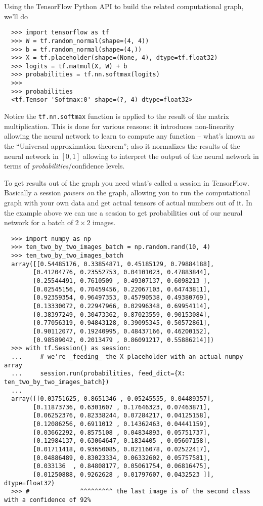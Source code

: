 Using the TensorFlow Python API to build the related computational
graph, we'll do

\begin{verbatim}
  >>> import tensorflow as tf
  >>> W = tf.random_normal(shape=(4, 4))
  >>> b = tf.random_normal(shape=(4,))
  >>> X = tf.placeholder(shape=(None, 4), dtype=tf.float32)
  >>> logits = tf.matmul(X, W) + b
  >>> probabilities = tf.nn.softmax(logits)
  >>>
  >>> probabilities
  <tf.Tensor 'Softmax:0' shape=(?, 4) dtype=float32>
\end{verbatim}

Notice the \texttt{tf.nn.softmax} function is applied to the result of
the matrix multiplication. This is done for various reasons: it
introduces non-linearity allowing the neural network to learn to
compute any function -- what's known as the ``Universal approximation
theorem''; also it normalizes the results of the neural network in
$[0,1]$ allowing to interpret the output of the neural network in terms
of \emph{probabilities}/confidence levels.

To get results out of the graph you need what's called a session in
TensorFlow. Basically a session \emph{powers on} the graph, allowing
you to run the computational graph with your own data and get actual
tensors of actual numbers out of it. In the example above we can use a
session to get probabilities out of our neural network for a batch of
\( 2 \times 2 \) images.

\begin{verbatim}
  >>> import numpy as np
  >>> ten_two_by_two_images_batch = np.random.rand(10, 4)
  >>> ten_two_by_two_images_batch 
  array([[0.54485176, 0.33854871, 0.45185129, 0.79884188],
        [0.41204776, 0.23552753, 0.04101023, 0.47883844],
        [0.25544491, 0.7610509 , 0.49307137, 0.6098213 ],
        [0.02545156, 0.70459456, 0.22067103, 0.64743811],
        [0.92359354, 0.96497353, 0.45790538, 0.49380769],
        [0.13330072, 0.22947966, 0.02996348, 0.69954114],
        [0.38397249, 0.30473362, 0.87023559, 0.90153084],
        [0.77056319, 0.94843128, 0.39095345, 0.50572861],
        [0.90112077, 0.19240995, 0.48437166, 0.46200152],
        [0.98589042, 0.2013479 , 0.86091217, 0.55886214]])
  >>> with tf.Session() as session:
  ...     # we're _feeding_ the X placeholder with an actual numpy array
  ...     session.run(probabilities, feed_dict={X: ten_two_by_two_images_batch})
  ...
  array([[0.03751625, 0.8651346 , 0.05245555, 0.04489357],
        [0.11873736, 0.6301607 , 0.17646323, 0.07463871],
        [0.06252376, 0.82338244, 0.07284217, 0.04125158],
        [0.12086256, 0.6911012 , 0.14362463, 0.04441159],
        [0.03662292, 0.8575108 , 0.04834893, 0.05751737],
        [0.12984137, 0.63064647, 0.1834405 , 0.05607158],
        [0.01711418, 0.93650085, 0.02116078, 0.02522417],
        [0.04886489, 0.83023334, 0.06332602, 0.05757581],
        [0.033136  , 0.84808177, 0.05061754, 0.06816475],
        [0.01250888, 0.9262628 , 0.01797607, 0.0432523 ]], dtype=float32)
  >>> #              ^^^^^^^^^ the last image is of the second class with a confidence of 92%
\end{verbatim}


